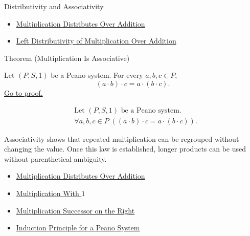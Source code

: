 \begin{topicbox}{Distributivity and Associativity}
\begin{dependencies}
\begin{itemize}
  \item \hyperref[thm:multiplication-distributes-over-addition]{Multiplication Distributes Over Addition}
  \item \hyperref[thm:left-distributivity-of-multiplication-over-addition]{Left Distributivity of Multiplication Over Addition}
\end{itemize}
\end{dependencies}

\begin{theorembox}{Theorem (Multiplication Is Associative)}
\begin{theorem}
\label{thm:multiplication-associative}
Let $(P,S,1)$ be a Peano system. For every $a,b,c \in P$,
\[
(a \cdot b) \cdot c = a \cdot (b \cdot c).
\]
\hyperref[prf:multiplication-associative]{Go to proof.}
\end{theorem}
\end{theorembox}

\begin{remark*}
\[
\begin{aligned}
&\text{Let } (P,S,1) \text{ be a Peano system.}\\
&\forall a,b,c \in P\;((a \cdot b) \cdot c = a \cdot (b \cdot c)).
\end{aligned}
\]
\end{remark*}

\begin{remark*}[Interpretation]
Associativity shows that repeated multiplication can be regrouped without
changing the value. Once this law is established, longer products can be used
without parenthetical ambiguity.
\end{remark*}

\begin{dependencies}
\begin{itemize}
  \item \hyperref[thm:multiplication-distributes-over-addition]{Multiplication Distributes Over Addition}
  \item \hyperref[thm:multiplication-with-one]{Multiplication With $1$}
  \item \hyperref[thm:multiplication-successor-on-right]{Multiplication Successor on the Right}
  \item \hyperref[thm:induction-principle-for-peano-system]{Induction Principle for a Peano System}
\end{itemize}
\end{dependencies}
\end{topicbox}

